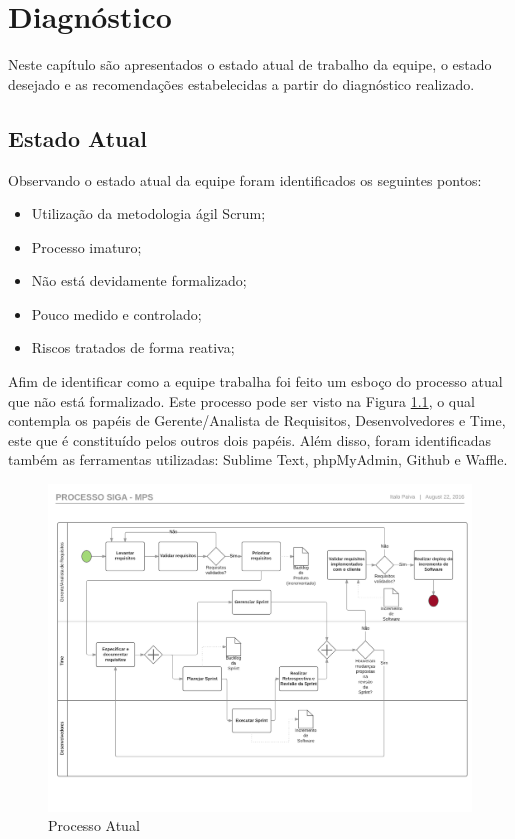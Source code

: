 \chapter{Diagnóstico}

Neste capítulo são apresentados o estado atual de trabalho da equipe, o estado desejado e as recomendações estabelecidas
a partir do diagnóstico realizado.

\section{Estado Atual}

Observando o estado atual da equipe foram identificados os seguintes pontos:

\begin{itemize}
  \item Utilização da metodologia ágil Scrum;
  \item Processo imaturo;
  \item Não está devidamente formalizado;
  \item Pouco medido e controlado;
  \item Riscos tratados de forma reativa;
\end{itemize}

Afim de identificar como a equipe trabalha foi feito um esboço do processo atual que não está formalizado. Este processo
pode ser visto na Figura \ref{fig:processo_atual}, o qual contempla os papéis de Gerente/Analista de Requisitos, Desenvolvedores e
Time, este que é constituído pelos outros dois papéis. Além disso, foram identificadas também as ferramentas utilizadas: 
Sublime Text, phpMyAdmin, Github e Waffle.

\begin{figure}[!ht]
\centering
\includegraphics[scale=0.5]{figuras/processo_atual.png}
\caption{Processo Atual}
\label{fig:processo_atual}
\end{figure}

